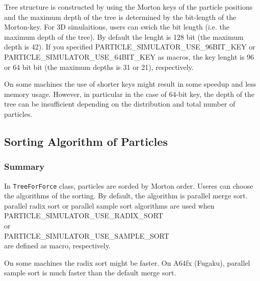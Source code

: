 Tree structure is constructed by using the Morton keys of the particle
positions and the maximum depth of the tree is determined by the
bit-length of the Morton-key. For 3D simulaitions, users can swich the
bit length (i.e. the maximum depth of the tree). By default the lenght
is 128 bit (the maximum depth is 42). If you specified
PARTICLE\_SIMULATOR\_USE\_96BIT\_KEY or
PARTICLE\_SIMULATOR\_USE\_64BIT\_KEY as macros, the key lenght is 96 or 64 bit
bit (the maximum depths is 31 or 21), respectively.



On some machines the use of shorter keys might result in some speedup
and less memory usage. However, in particular in the case of 64-bit
key, the depth of the tree can be insufficient depending on the
distribution and total number of particles.



\subsection{Sorting Algorithm of Particles}
\label{sec:compile_sort_method}
\subsubsection{Summary}


In {\tt TreeForForce} class, particles are sorded by Morton
order. Useres can choose the algorithms of the sorting. By default,
the algorithm is parallel merge sort. parallel radix sort  or
parallel sample sort algorithms are  used
when\\
PARTICLE\_SIMULATOR\_USE\_RADIX\_SORT\\
or\\
PARTICLE\_SIMULATOR\_USE\_SAMPLE\_SORT\\
are defined as macro, respectively.



On some machines the radix sort might be faster. On A64fx (Fugaku),
parallel sample sort is much faster than the default merge sort.


